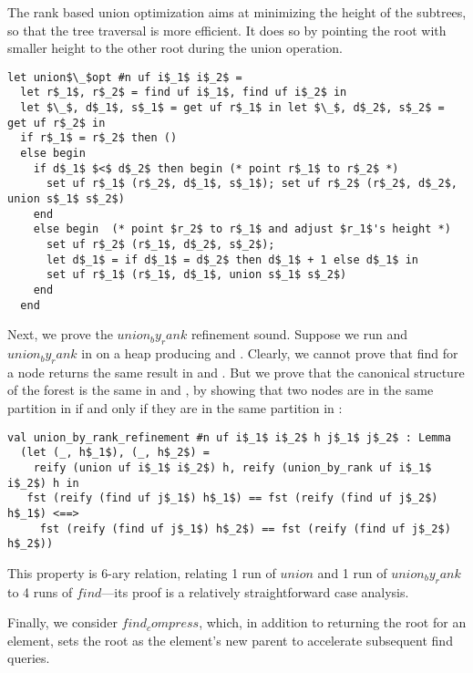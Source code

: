 \documentclass[sigplan,screen]{acmart}\settopmatter{}
\begin{document}
\iffull

 The rank based union optimization aims at
minimizing the height of the subtrees, so that the tree traversal is
more efficient. It does so by pointing the root with smaller height to
the other root during the union operation.

\begin{lstlisting}
let union$\_$opt #n uf i$_1$ i$_2$ =
  let r$_1$, r$_2$ = find uf i$_1$, find uf i$_2$ in
  let $\_$, d$_1$, s$_1$ = get uf r$_1$ in let $\_$, d$_2$, s$_2$ = get uf r$_2$ in
  if r$_1$ = r$_2$ then ()
  else begin
    if d$_1$ $<$ d$_2$ then begin (* point r$_1$ to r$_2$ *)
      set uf r$_1$ (r$_2$, d$_1$, s$_1$); set uf r$_2$ (r$_2$, d$_2$, union s$_1$ s$_2$)
    end
    else begin  (* point $r_2$ to r$_1$ and adjust $r_1$'s height *)
      set uf r$_2$ (r$_1$, d$_2$, s$_2$);
      let d$_1$ = if d$_1$ = d$_2$ then d$_1$ + 1 else d$_1$ in
      set uf r$_1$ (r$_1$, d$_1$, union s$_1$ s$_2$)
    end
  end
\end{lstlisting}
\fi

Next, we prove the \ls$union_by_rank$ refinement
sound. Suppose we run  and \ls$union_by_rank$ in 
on a heap  producing  and .
%
Clearly, we cannot prove that find for a node  returns the same
result in  and . But we prove that the canonical
structure of the forest is the same in  and , by
showing that two nodes are in the same partition in  if and only if
they are in the same partition in :

\begin{lstlisting}
val union_by_rank_refinement #n uf i$_1$ i$_2$ h j$_1$ j$_2$ : Lemma
  (let (_, h$_1$), (_, h$_2$) = 
    reify (union uf i$_1$ i$_2$) h, reify (union_by_rank uf i$_1$ i$_2$) h in
   fst (reify (find uf j$_1$) h$_1$) == fst (reify (find uf j$_2$) h$_1$) <==> 
     fst (reify (find uf j$_1$) h$_2$) == fst (reify (find uf j$_2$) h$_2$))
\end{lstlisting}

This property is $6$-ary relation, relating 1 run of \ls$union$ and
1 run of \ls$union_by_rank$ to 4 runs of \ls$find$---its proof is a
relatively straightforward case analysis.

 Finally, we consider \ls$find_compress$,
which, in addition to returning the root for an element, sets the root
as the element's new parent to accelerate subsequent find queries.
\iffull
\end{document}
